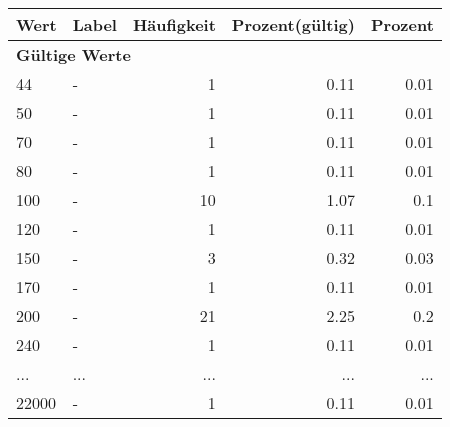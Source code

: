     \begin{longtable}{lXrrr}
     \toprule
     \textbf{Wert} & \textbf{Label} & \textbf{Häufigkeit} & \textbf{Prozent(gültig)} & \textbf{Prozent} \\
     \endhead
     \midrule
     \multicolumn{5}{l}{\textbf{Gültige Werte}}\\
        44 & \multicolumn{1}{X}{-} & %
          \num{1} &
          \num[round-mode=places,round-precision=2]{0,11} &
          \num[round-mode=places,round-precision=2]{0,01} \\
        50 & \multicolumn{1}{X}{-} & %
          \num{1} &
          \num[round-mode=places,round-precision=2]{0,11} &
          \num[round-mode=places,round-precision=2]{0,01} \\
        70 & \multicolumn{1}{X}{-} & %
          \num{1} &
          \num[round-mode=places,round-precision=2]{0,11} &
          \num[round-mode=places,round-precision=2]{0,01} \\
        80 & \multicolumn{1}{X}{-} & %
          \num{1} &
          \num[round-mode=places,round-precision=2]{0,11} &
          \num[round-mode=places,round-precision=2]{0,01} \\
        100 & \multicolumn{1}{X}{-} & %
          \num{10} &
          \num[round-mode=places,round-precision=2]{1,07} &
          \num[round-mode=places,round-precision=2]{0,1} \\
        120 & \multicolumn{1}{X}{-} & %
          \num{1} &
          \num[round-mode=places,round-precision=2]{0,11} &
          \num[round-mode=places,round-precision=2]{0,01} \\
        150 & \multicolumn{1}{X}{-} & %
          \num{3} &
          \num[round-mode=places,round-precision=2]{0,32} &
          \num[round-mode=places,round-precision=2]{0,03} \\
        170 & \multicolumn{1}{X}{-} & %
          \num{1} &
          \num[round-mode=places,round-precision=2]{0,11} &
          \num[round-mode=places,round-precision=2]{0,01} \\
        200 & \multicolumn{1}{X}{-} & %
          \num{21} &
          \num[round-mode=places,round-precision=2]{2,25} &
          \num[round-mode=places,round-precision=2]{0,2} \\
        240 & \multicolumn{1}{X}{-} & %
          \num{1} &
          \num[round-mode=places,round-precision=2]{0,11} &
          \num[round-mode=places,round-precision=2]{0,01} \\
       ... & ... & ... & ... & ... \\
        22000 & \multicolumn{1}{X}{-} & %
          \num{1} &
          \num[round-mode=places,round-precision=2]{0,11} &
          \num[round-mode=places,round-precision=2]{0,01} \\


\end{longtable}
